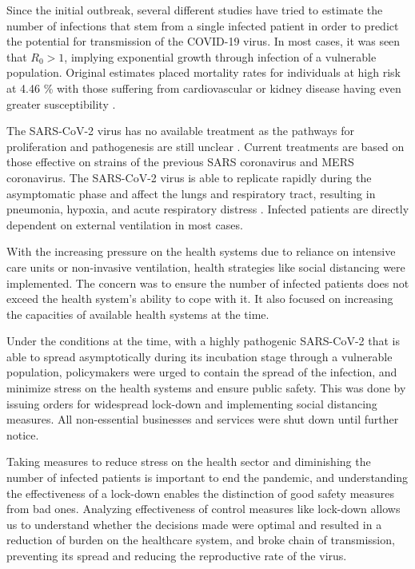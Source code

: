 \documentclass[preprint,authoryear,12pt]{elsarticle}
\begin{document}
	Since the initial outbreak, several different studies have tried to estimate the number of infections \cite{GN2020} that stem from a single infected patient in order to predict the potential for transmission of the COVID-19 virus. In most cases, it was seen that $R_0 > 1$, implying exponential growth through infection of a vulnerable population. Original estimates placed mortality rates for individuals at high risk at  4.46 \% with those suffering from cardiovascular or kidney disease having even greater susceptibility \cite{BPH2020}. 
	
	The SARS-CoV-2 virus has no available treatment as the pathways for proliferation and pathogenesis are still unclear \cite{RIS2020}.  Current treatments are based on those effective on strains of the previous SARS coronavirus and MERS coronavirus. The SARS-CoV-2  virus is able to replicate rapidly during the asymptomatic phase and affect the lungs and respiratory tract, resulting in pneumonia, hypoxia, and acute respiratory distress \cite{PSL2020}. Infected patients are directly dependent on external ventilation in most cases. 
	
	With the increasing pressure on the health systems due to reliance on intensive care units or non-invasive ventilation, health strategies like social distancing were implemented. The concern was to ensure the number of infected patients does not exceed the health system’s ability to cope with it. It also focused on increasing the capacities of available health systems at the time.
	
	Under the conditions at the time, with a highly pathogenic SARS-CoV-2 that is able to spread asymptotically during its incubation stage through a vulnerable population, policymakers were urged to contain the spread of the infection, and minimize stress on the health systems and ensure public safety. This was done by issuing orders for widespread lock-down and implementing social distancing measures. All non-essential businesses and services were shut down until further notice. 
	
	Taking measures to reduce stress on the health sector and diminishing the number of infected patients is important to end the pandemic, and understanding the effectiveness of a lock-down enables the distinction of good safety measures from bad ones. Analyzing effectiveness of control measures like lock-down allows us to understand whether the decisions made were optimal and resulted in a reduction of burden on the healthcare system, and broke chain of transmission, preventing its spread and reducing the reproductive rate of the virus.
	
\end{document}
